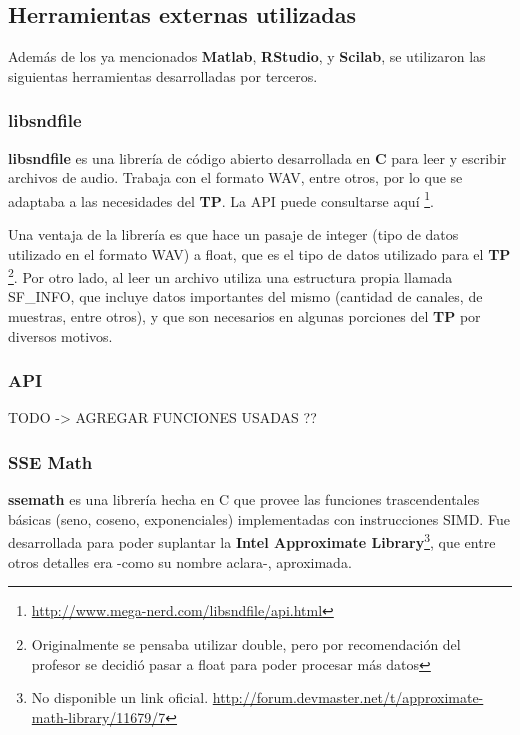 \subsection{Herramientas externas utilizadas}
\label{subsec:herramientas}
Además de los ya mencionados \textbf{Matlab}, \textbf{RStudio}, y \textbf{Scilab}, se utilizaron las siguientas herramientas desarrolladas por terceros.

\subsubsection{libsndfile}
\label{subsec:libsndfile}
\textbf{libsndfile} es una librería de código abierto desarrollada en \textbf{C} para leer y escribir archivos de audio. Trabaja con el formato WAV, entre otros, por lo que se adaptaba a las necesidades del \textbf{TP}. La API puede consultarse aquí \footnote{\url{http://www.mega-nerd.com/libsndfile/api.html}}.\vspace{\baselineskip}

Una ventaja de la librería es que hace un pasaje de integer (tipo de datos utilizado en el formato WAV) a float, que es el tipo de datos utilizado para el \textbf{TP} \footnote{Originalmente se pensaba utilizar double, pero por recomendación del profesor se decidió pasar a float para poder procesar más datos}. Por otro lado, al leer un archivo utiliza una estructura propia llamada SF\_INFO, que incluye datos importantes del mismo (cantidad de canales, de muestras, entre otros), y que son necesarios en algunas porciones del \textbf{TP} por diversos motivos.

\subsubsection*{API}
\label{subsec:libsndfile-api}

TODO -> AGREGAR FUNCIONES USADAS ??

\subsubsection{SSE Math}
\label{subsec:ssemath}
\textbf{ssemath} es una librería hecha en C que provee las funciones trascendentales básicas (seno, coseno, exponenciales) implementadas con instrucciones SIMD. Fue desarrollada para poder suplantar la \textbf{Intel Approximate Library}\footnote{No disponible un link oficial. \url{http://forum.devmaster.net/t/approximate-math-library/11679/7}}, que entre otros detalles era -como su nombre aclara-, aproximada.\vspace{\baselineskip}


